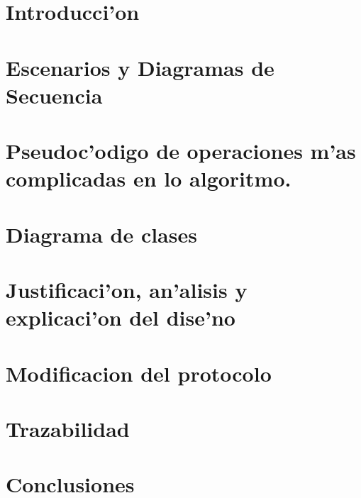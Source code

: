 \documentclass[spanish, a4paper, 10pt, titlepage]{article}
\author{Echevarr'ia - Farjat - Freijo - Giusto}
\begin{document}

\tableofcontents
\clearpage



\section{Introducci'on}

\clearpage
 
\section{Escenarios y Diagramas de Secuencia}

\clearpage

\section{Pseudoc'odigo de operaciones m'as complicadas en lo algoritmo.}



\section{Diagrama de clases}

\clearpage

\section{Justificaci'on, an'alisis y explicaci'on del dise'no}

\clearpage

\section{Modificacion del protocolo}

\clearpage


\section{Trazabilidad}

\clearpage

\section{Conclusiones}

\clearpage
\end{document}
